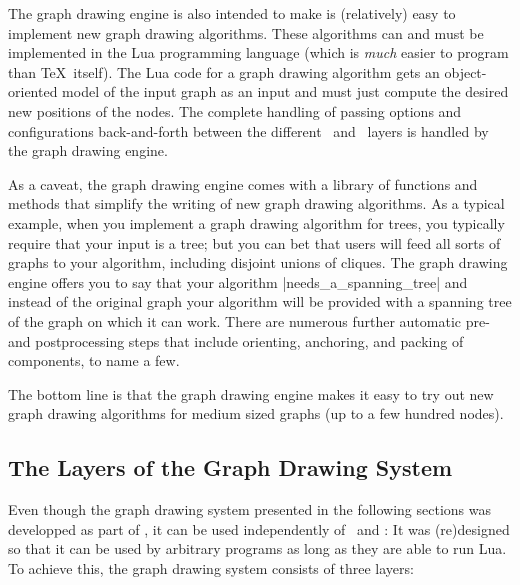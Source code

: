 The graph drawing engine is also intended to make is
(relatively) easy to implement new graph drawing algorithms. These
algorithms can and must be implemented in the Lua programming
language (which is \emph{much} easier to program than \TeX\
itself). The Lua code for a graph drawing algorithm gets an
object-oriented model of the input graph as an input and must just
compute the desired new positions of the nodes. The complete
handling of passing options and configurations back-and-forth
between the different \tikzname\ and \pgfname\ layers is handled by
the graph drawing engine. 

As a caveat, the graph drawing engine comes with a library of
functions and methods that simplify the writing of new
graph drawing algorithms. As a typical example, when you implement a 
graph drawing algorithm for trees, you typically require that your
input is a tree; but you can bet that users will feed all sorts of
graphs to your algorithm, including disjoint unions of cliques. The
graph drawing engine offers you to say that your algorithm
|needs_a_spanning_tree| and instead of the original graph your
algorithm will be provided with a spanning tree of the graph on
which it can work. There are numerous further automatic pre- and
postprocessing steps that include orienting, anchoring, and packing
of components, to name a few.

The bottom line is that the graph drawing engine makes it easy
to try out new graph drawing algorithms for medium sized graphs (up
to a few hundred nodes).



\subsection{The Layers of the Graph Drawing System}

\label{section-gd-layers}

Even though the graph drawing system presented in the following
sections was developped as part of \pgfname, it can be used
independently of \pgfname\ and \tikzname: It was (re)designed so that
it can be used by arbitrary programs as long as they are able to run
Lua. To achieve this, the graph drawing system consists of three
layers:

